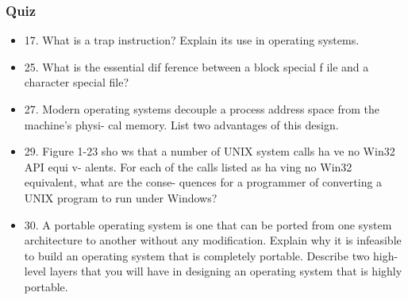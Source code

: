 \begin{frame}
    \frametitle{Quiz}
    
    \begin{itemize}
        \item 
        17. What is a trap instruction? Explain its use in operating systems.
        \item 
        25. What is the essential dif ference between a block special f ile and a character special
        file?
        \item
        27. Modern operating systems decouple a process address space from the machine’s physi-
        cal memory. List two advantages of this design.
        \item
        29. Figure 1-23 sho ws that a number of UNIX system calls ha ve no Win32 API equi v-
        alents. For each of the calls listed as ha ving no Win32 equivalent, what are the conse-
        quences for a programmer of converting a UNIX program to run under Windows?
        \item
        30. A portable operating system is one that can be ported from one system architecture to
        another without any modification. Explain why it is infeasible to build an operating
        system that is completely portable. Describe two high-level layers that you will have in
        designing an operating system that is highly portable.
    \end{itemize}    

\end{frame}
